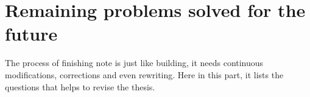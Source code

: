 %
%
%
%
%
\chapter{Remaining problems solved for the future}
%
%
%
%
The process of finishing note is just like building, it needs
continuous modifications, corrections and even rewriting. Here in this
part, it lists the questions that helps to revise the thesis. 







